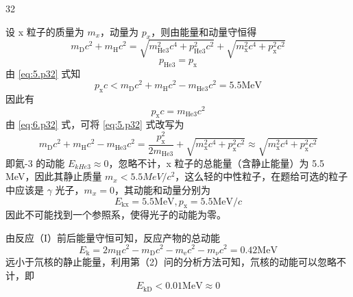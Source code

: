 \begin{solution}{32}
\begin{subsolution}
    设 x 粒子的质量为 $m_{x}$，动量为 $p_{x}$，则由能量和动量守恒得
    \begin{equation}
      m_{\mathrm{D}} c^{2} + m_{\mathrm{H}} c^{2} = \sqrt{m_{\mathrm{He3}}^{2} c^{4} + p_{\mathrm{He3}}^{2} c^{2}} + \sqrt{m_{\mathrm{x}}^{2} c^{4} + p_{\mathrm{x}}^{2} c^{2}}
      \label{eq:5.p32}
    \end{equation}
    \begin{equation}
      p_{\mathrm{He} 3} = p_{\mathrm{x}}
      \label{eq:6.p32}
    \end{equation}
    由 \eqref{eq:5.p32} 式知
    \begin{equation}
      p_{\mathrm{x}} c < m_{\mathrm{D}} c^{2} + m_{\mathrm{H}} c^{2} - m_{\mathrm{He3}} c^{2} = 5.5 \mathrm{MeV}
      \label{eq:7.p32}
    \end{equation}
    因此有
    \begin{equation}
      p_{\mathrm{x}} c = m_{\mathrm{He3}} c^{2}
    \end{equation}
    由 \eqref{eq:6.p32} 式，可将 \eqref{eq:5.p32} 式改写为
    \begin{equation}
      m_{\mathrm{D}} c^{2} + m_{\mathrm{H}} c^{2} - m_{\mathrm{He3}} c^{2} = \frac{p_{\mathrm{x}}^{2}}{2 m_{\mathrm{He3}}} + \sqrt{m_{\mathrm{x}}^{2} c^{4} + p_{\mathrm{x}}^{2} c^{2}} \approx \sqrt{m_{\mathrm{x}}^{2} c^{4} + p_{\mathrm{x}}^{2} c^{2}}
      \label{eq:8.p32}
    \end{equation}
    即氦-3 的动能 $E_{kHe3} \approx 0$，忽略不计，x 粒子的总能量（含静止能量）为 5.5 MeV，因此其静止质量 $m_{x} < 5.5 MeV/c^{2}$，这么轻的中性粒子，在题给可选的粒子中应该是 $\gamma$ 光子，$m_{x} = 0$，其动能和动量分别为
    \begin{equation}
      E_{\mathrm{kx}} = 5.5 \mathrm{MeV}, p_{\mathrm{x}} = 5.5 \mathrm{MeV} / c
      \label{eq:9.p32}
    \end{equation}
    因此不可能找到一个参照系，使得光子的动能为零。
  \end{subsolution}
  \begin{subsolution}
    由反应（I）前后能量守恒可知，反应产物的总动能
    \begin{equation}
      E_{\mathrm{k}} = 2 m_{\mathrm{H}} c^{2} - m_{\mathrm{D}} c^{2} - m_{\mathrm{e}} c^{2} - m_{\nu} c^{2} = 0.42 \mathrm{MeV}
      \label{eq:10.p32}
    \end{equation}
    远小于氘核的静止能量，利用第（2）问的分析方法可知，氘核的动能可以忽略不计，即
    \begin{equation}
      E_{\mathrm{kD}} < 0.01 \mathrm{MeV} \approx 0

\end{equation}
\end{subsolution}
\end{solution}

